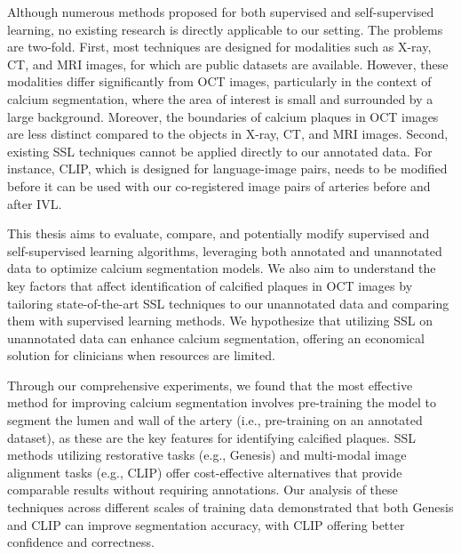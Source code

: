 \documentclass[a4paper,11pt,oneside]{report}
\begin{document}
Although numerous methods proposed for both supervised and self-supervised learning, no existing research is directly applicable to our setting. The problems are two-fold. First, most techniques are designed for modalities such as X-ray, CT, and MRI images, for which are public datasets are available. However, these modalities differ significantly from OCT images, particularly in the context of calcium segmentation, where the area of interest is small and surrounded by a large background. Moreover, the boundaries of calcium plaques in OCT images are less distinct compared to the objects in X-ray, CT, and MRI images. Second, existing SSL techniques cannot be applied directly to our annotated data. For instance, CLIP, which is designed for language-image pairs, needs to be modified before it can be used with our co-registered image pairs of arteries before and after IVL. 

This thesis aims to evaluate, compare, and potentially modify supervised and self-supervised learning algorithms, leveraging both annotated and unannotated data to optimize calcium segmentation models. We also aim to understand the key factors that affect identification of calcified plaques in OCT images by tailoring state-of-the-art SSL techniques to our unannotated data and comparing them with supervised learning methods. 
We hypothesize that utilizing SSL on unannotated data can enhance calcium segmentation, offering an economical solution for clinicians when resources are limited.

Through our comprehensive experiments, we found that the most effective method for improving calcium segmentation involves pre-training the model to segment the lumen and wall of the artery (i.e., pre-training on an annotated dataset), as these are the key features for identifying calcified plaques. SSL methods utilizing restorative tasks (e.g., Genesis) and multi-modal image alignment tasks (e.g., CLIP) offer cost-effective alternatives that provide comparable results without requiring annotations. Our analysis of these techniques across different scales of training data demonstrated that both Genesis and CLIP can improve segmentation accuracy, with CLIP offering better confidence and correctness.
\end{document}
